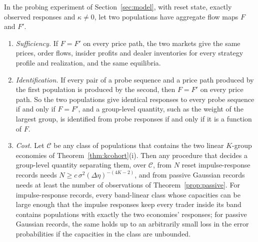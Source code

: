 \begin{theorem}\label{thm:anypop}
In the probing experiment of Section~\ref{sec:model}, with reset state, exactly observed responses and $\kappa\ne0$, let two populations have aggregate flow maps $F$ and $F'$.
\begin{enumerate}[label=(\roman*),itemsep=1pt]
\item \emph{Sufficiency.} If $F=F'$ on every price path, the two markets give the same prices, order flows, insider profits and dealer inventories for every strategy profile and realization, and the same equilibria.
\item \emph{Identification.} If every pair of a probe sequence and a price path produced by the first population is produced by the second, then $F=F'$ on every price path. So the two populations give identical responses to every probe sequence if and only if $F=F'$, and a group-level quantity, such as the weight of the largest group, is identified from probe responses if and only if it is a function of $F$.
\item \emph{Cost.} Let $\mathcal C$ be any class of populations that contains the two linear $K$-group economies of Theorem~\ref{thm:kcohort}(i). Then any procedure that decides a group-level quantity separating them, over $\mathcal C$, from $N$ reset impulse-response records needs $N\ge c\,\sigma^2(\Delta\eta)^{-(4K-2)}$, and from passive Gaussian records needs at least the number of observations of Theorem~\ref{prop:passive}. For impulse-response records, every band-linear class whose capacities can be large enough that the impulse responses keep every trader inside its band contains populations with exactly the two economies' responses; for passive Gaussian records, the same holds up to an arbitrarily small loss in the error probabilities if the capacities in the class are unbounded.
\end{enumerate}
\end{theorem}

